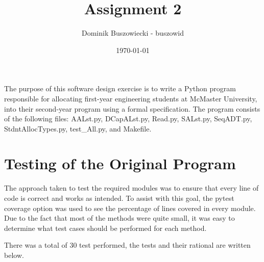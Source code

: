 \documentclass[12pt]{article}
\title{Assignment 2}
\author{Dominik Buszowiecki - buszowid}
\date{\today}
\begin{document}
\maketitle

The purpose of this software design exercise is to write a Python program responsible for allocating first-year
engineering students at McMaster University, into their second-year program using a formal specification.
The program consists of the following files: AALst.py, DCapALst.py, Read.py, SALst.py, SeqADT.py, StdntAllocTypes.py,
test\_All.py, and Makefile.

\section{Testing of the Original Program}

The approach taken to test the required modules was to ensure that every line of code is correct and works as intended.
To assist with this goal, the pytest coverage option was used to see the percentage of lines covered in every module.
Due to the fact that most of the methods were quite small, it was easy to determine what test cases should be performed
for each method.

There was a total of 30 test performed, the tests and their rational are written below.
\medskip
\end{document}
